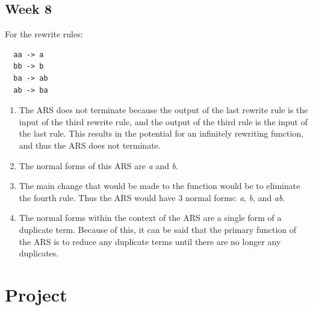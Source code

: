 \documentclass{article}
\theoremstyle{theorem}
\theoremstyle{definition}
\theoremstyle{remark}
\begin{document}
\subsection{Week 8}
For the rewrite rules:
\begin{lstlisting}
  aa -> a
  bb -> b
  ba -> ab
  ab -> ba
\end{lstlisting}
\begin{enumerate}
    \item The ARS does not terminate because the output of the last rewrite rule is the input of the third rewrite rule, and the output of the third rule is the input of the last rule. This results in the potential for an infinitely rewriting function, and thus the ARS does not terminate.
    \item The normal forms of this ARS are \textit{a} and \textit{b}.
    \item The main change that would be made to the function would be to eliminate the fourth rule. Thus the ARS would have 3 normal forms: \textit{a}, \textit{b}, and \textit{ab}.
    \item The normal forms within the context of the ARS are a single form of a duplicate term. Because of this, it can be said that the primary function of the ARS is to reduce any duplicate terms until there are no longer any duplicates.
\end{enumerate}
\section{Project}\label{Project}
\end{document}
